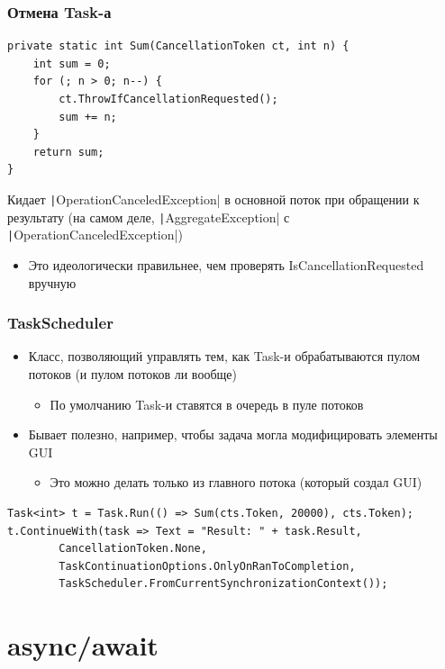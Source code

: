 \documentclass[xetex,mathserif,serif]{beamer}
\begin{document}
	\begin{frame}[fragile]
		\frametitle{Отмена Task-а}
		\begin{verbatim}
private static int Sum(CancellationToken ct, int n) {
    int sum = 0;
    for (; n > 0; n--) {
        ct.ThrowIfCancellationRequested();
        sum += n;
    }
    return sum;
}
		\end{verbatim}
		\vspace{3mm}
		Кидает \texttt|OperationCanceledException| в основной поток при обращении к результату (на самом деле, \texttt|AggregateException| с \texttt|OperationCanceledException|)
		\begin{itemize}
			\item Это идеологически правильнее, чем проверять IsCancellationRequested вручную
		\end{itemize}
	\end{frame}

	\begin{frame}[fragile]
		\frametitle{TaskScheduler}
		\begin{itemize}
			\item Класс, позволяющий управлять тем, как Task-и обрабатываются пулом потоков (и пулом потоков ли вообще)
			\begin{itemize}
				\item По умолчанию Task-и ставятся в очередь в пуле потоков
			\end{itemize}
			\item Бывает полезно, например, чтобы задача могла модифицировать элементы GUI
			\begin{itemize}
				\item Это можно делать только из главного потока (который создал GUI)
			\end{itemize}
		\end{itemize}

		\begin{small}
			\begin{verbatim}
Task<int> t = Task.Run(() => Sum(cts.Token, 20000), cts.Token);
t.ContinueWith(task => Text = "Result: " + task.Result,
        CancellationToken.None,
        TaskContinuationOptions.OnlyOnRanToCompletion,
        TaskScheduler.FromCurrentSynchronizationContext());
			\end{verbatim}
		\end{small}
	\end{frame}

	\section{async/await}
\end{document}
